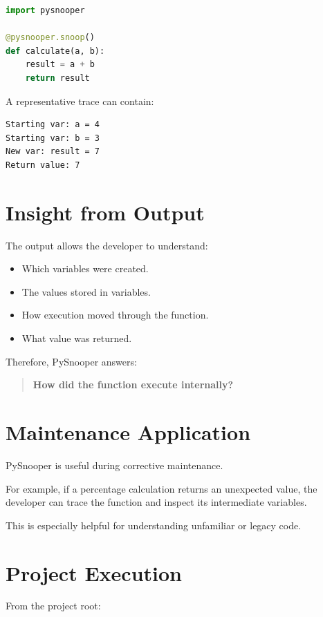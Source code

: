 \documentclass[12pt,a4paper]{report}
\begin{document}
\begin{lstlisting}[language=Python]
import pysnooper

@pysnooper.snoop()
def calculate(a, b):
    result = a + b
    return result
\end{lstlisting}

A representative trace can contain:

\begin{lstlisting}
Starting var: a = 4
Starting var: b = 3
New var: result = 7
Return value: 7
\end{lstlisting}

\section{Insight from Output}

The output allows the developer to understand:

\begin{itemize}
    \item Which variables were created.
    \item The values stored in variables.
    \item How execution moved through the function.
    \item What value was returned.
\end{itemize}

Therefore, PySnooper answers:

\begin{quote}
\textbf{How did the function execute internally?}
\end{quote}

\section{Maintenance Application}

PySnooper is useful during corrective maintenance.

For example, if a percentage calculation returns an unexpected value,
the developer can trace the function and inspect its intermediate
variables.

This is especially helpful for understanding unfamiliar or legacy
code.

\section{Project Execution}

From the project root:
\end{document}
